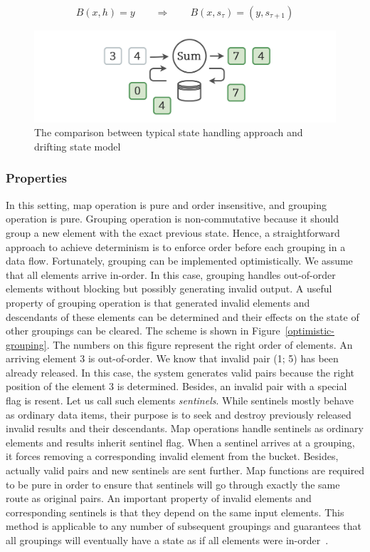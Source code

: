 \begin{equation}
  \label{flink-contract}
  B(x, h) = y \qquad\Longrightarrow\qquad B(x, s_{\tau}) = (y, s_{\tau+1}) 
\end{equation}

\begin{figure}[htbp]
  \centering
  \includegraphics[width=.49\textwidth]{pics/classical-drifting}
  \caption{The comparison between typical state handling approach and drifting state model}
  \label {classical-drifting}
\end{figure}

\subsubsection{Properties}

In this setting, map operation is pure and order insensitive, and grouping operation is pure. Grouping operation is non-commutative because it should group a new element with the exact previous state. Hence, a straightforward approach to achieve determinism is to enforce order before each grouping in a data flow. Fortunately, grouping can be implemented optimistically. We assume that all elements arrive in-order. In this case, grouping handles out-of-order elements without blocking but possibly generating invalid output. A useful property of grouping operation is that generated invalid elements and descendants of these elements can be determined and their effects on the state of other groupings can be cleared. The scheme is shown in Figure~\ref{optimistic-grouping}. The numbers on this figure represent the right order of elements. An arriving element 3 is out-of-order. We know that invalid pair (1; 5) has been already released. In this case, the system generates valid pairs because the right position of the element 3 is determined. Besides, an invalid pair with a special flag is resent. Let us call such elements {\em sentinels}. While sentinels mostly behave as ordinary data items, their purpose is to seek and destroy previously released invalid results and their descendants. Map operations handle sentinels as ordinary elements and results inherit sentinel flag. When a sentinel arrives at a grouping, it forces removing a corresponding invalid element from the bucket. Besides, actually valid pairs and new sentinels are sent further. Map functions are required to be pure in order to ensure that sentinels will go through exactly the same route as original pairs. An important property of invalid elements and corresponding sentinels is that they depend on the same input elements. This method is applicable to any number of subsequent groupings and guarantees that all groupings will eventually have a state as if all elements were in-order~\cite{we2018adbis}.
 
